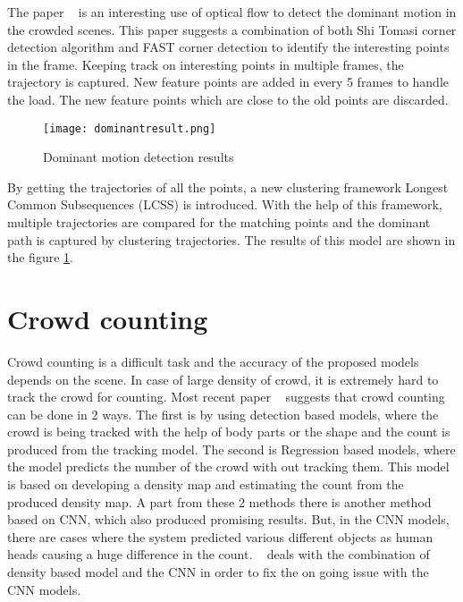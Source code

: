 The paper ~\cite{cheriyadat2008detecting} is an interesting use of optical flow to detect the dominant 
motion in the crowded scenes. This paper suggests a combination of both Shi Tomasi corner detection 
algorithm and FAST corner detection to identify the  interesting points in the frame. Keeping track on 
interesting points in multiple frames, the trajectory is captured. New feature points are added in every 5 
frames to handle the load. The new feature points which are close to the old points are discarded. 
\begin{figure}[tb]
	\center\texttt{[image: dominantresult.png]}
	\caption{Dominant motion detection results}
	\label{fig:dominantresult}
\end{figure}
By getting the trajectories of all the points, a new clustering framework Longest Common Subsequences 
(LCSS) is introduced. With the help of this framework, multiple trajectories are compared for the 
matching points and the dominant path is captured by clustering trajectories. The results of this model 
are shown in the figure \ref{fig:dominantresult}.

\section{Crowd counting}
Crowd counting is a difficult task and the accuracy of the proposed models depends on the scene. In 
case of large density of crowd, it is extremely hard to track the crowd for counting. Most recent paper 
~\cite{chen2020crowd} suggests that crowd counting can be done in 2 ways. The first is by using 
detection based models, where the crowd is being tracked with the help of body parts or the shape and 
the count is produced from the tracking model. The second is Regression based models, where the 
model predicts the number of the crowd with out tracking them. This model is based on developing a 
density map and estimating the count from the produced density map. A part from these 2 methods 
there is another method based on CNN, which also produced promising results. But, in the CNN 
models, there are cases where the system predicted various different objects as human heads causing 
a huge difference in the count.  ~\cite{chen2020crowd} deals with the combination of density based 
model and the CNN in order to fix the on going issue with the CNN models.

